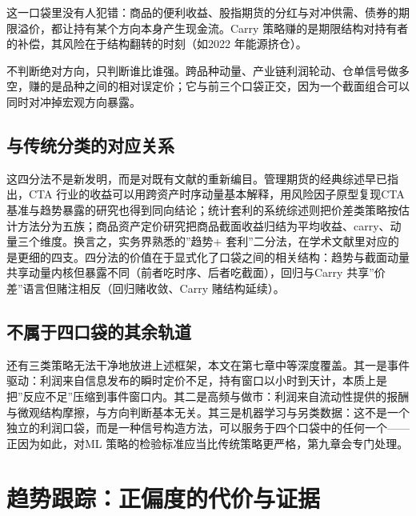 \documentclass[12pt,a4paper]{ctexart}
\begin{document}
这一口袋里没有人犯错：商品的便利收益、股指期货的分红与对冲供需、债券的期限溢价，都让持有某个方向本身产生现金流。Carry 策略赚的是期限结构对持有者的补偿，其风险在于结构翻转的时刻（如2022 年能源挤仓）。


不判断绝对方向，只判断谁比谁强。跨品种动量、产业链利润轮动、仓单信号做多空，赚的是品种之间的相对误定价；它与前三个口袋正交，因为一个截面组合可以同时对冲掉宏观方向暴露。


\subsection{与传统分类的对应关系}

这四分法不是新发明，而是对既有文献的重新编目。管理期货的经典综述早已指出，CTA 行业的收益可以用跨资产时序动量基本解释\cite{01}，用风险因子原型复现CTA 基准与趋势暴露的研究也得到同向结论\cite{21}；统计套利的系统综述则把价差类策略按估计方法分为五族\cite{37}；商品资产定价研究把商品截面收益归结为平均收益、carry、动量三个维度\cite{65}。换言之，实务界熟悉的”\hspace{0.3em}趋势+ 套利”\hspace{0.3em}二分法，在学术文献里对应的是更细的四支。四分法的价值在于显式化了口袋之间的相关结构：趋势与截面动量共享动量内核但暴露不同（前者吃时序、后者吃截面），回归与Carry 共享”\hspace{0.3em}价差”\hspace{0.3em}语言但赌注相反（回归赌收敛、Carry 赌结构延续）。


\subsection{不属于四口袋的其余轨道}

还有三类策略无法干净地放进上述框架，本文在第七章中等深度覆盖。其一是事件驱动：利润来自信息发布的瞬时定价不足，持有窗口以小时到天计，本质上是把”\hspace{0.3em}反应不足”\hspace{0.3em}压缩到事件窗口内。其二是高频与做市：利润来自流动性提供的报酬与微观结构摩擦，与方向判断基本无关。其三是机器学习与另类数据：这不是一个独立的利润口袋，而是一种信号构造方法，可以服务于四个口袋中的任何一个——正因为如此，对ML 策略的检验标准应当比传统策略更严格，第九章会专门处理。


\section{趋势跟踪：正偏度的代价与证据}
\end{document}
